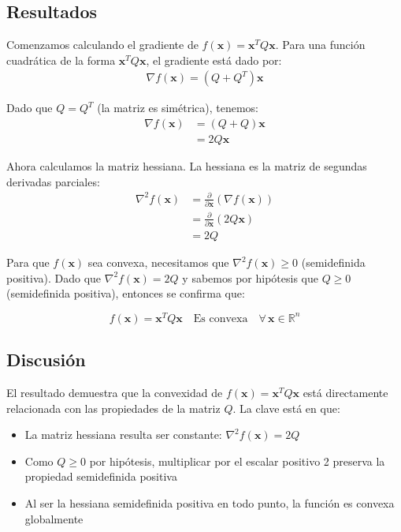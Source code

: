 \documentclass{article}
\begin{document}
\subsection{Resultados}
\setcounter{equation}{0}

Comenzamos calculando el gradiente de $f(\mathbf{x}) = \mathbf{x}^T Q \mathbf{x}$.
Para una función cuadrática de la forma $\mathbf{x}^T Q \mathbf{x}$, el gradiente está dado por:
\begin{align}
\nabla f(\mathbf{x}) = (Q + Q^T)\mathbf{x}
\end{align}

Dado que $Q = Q^T$ (la matriz es simétrica), tenemos:
\begin{align}
\nabla f(\mathbf{x}) &= (Q + Q)\mathbf{x} \\
&= 2Q\mathbf{x}
\end{align}

Ahora calculamos la matriz hessiana. La hessiana es la matriz de segundas derivadas parciales:
\begin{align}
\nabla^2 f(\mathbf{x}) &= \frac{\partial}{\partial \mathbf{x}}(\nabla f(\mathbf{x})) \\
&= \frac{\partial}{\partial \mathbf{x}}(2Q\mathbf{x}) \\
&= 2Q
\end{align}

Para que $f(\mathbf{x})$ sea convexa, necesitamos que $\nabla^2 f(\mathbf{x}) \geq 0$ (semidefinida positiva).
Dado que $\nabla^2 f(\mathbf{x}) = 2Q$ y sabemos por hipótesis que $Q \geq 0$ (semidefinida positiva), entonces se confirma que:

\begin{equation*}
    f(\mathbf{x}) = \mathbf{x}^T Q \mathbf{x} \quad \text{Es convexa} \quad \forall \, \mathbf{x} \in \mathbb{R}^n
\end{equation*}

\subsection{Discusión}

El resultado demuestra que la convexidad de $f(\mathbf{x}) = \mathbf{x}^T Q \mathbf{x}$ está directamente relacionada con las propiedades de la matriz $Q$. La clave está en que:

\begin{itemize}
    \item La matriz hessiana resulta ser constante: $\nabla^2 f(\mathbf{x}) = 2Q$
    \item Como $Q \geq 0$ por hipótesis, multiplicar por el escalar positivo 2 preserva la propiedad semidefinida positiva
    \item Al ser la hessiana semidefinida positiva en todo punto, la función es convexa globalmente
\end{itemize}
\end{document}
